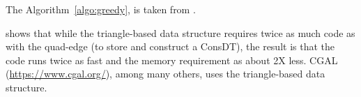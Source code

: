 
The Algorithm~\ref{algo:greedy}, is taken from \citet[p. 202]{Worboys04}.

\citet{Shewchuk97} shows that while the triangle-based data structure requires twice as much code as with the quad-edge (to store and construct a ConsDT), the result is that the code runs twice as fast and the memory requirement as about 2X less.
CGAL (\url{https://www.cgal.org/}), among many others, uses the triangle-based data structure.


